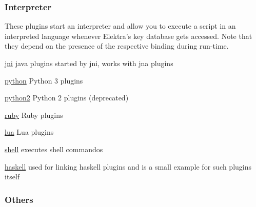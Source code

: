 \subsubsection*{Interpreter}

These plugins start an interpreter and allow you to execute a script in an interpreted language whenever Elektra’s key database gets accessed. Note that they depend on the presence of the respective binding during run-\/time.


\begin{DoxyItemize}
\item \hyperlink{md_src_plugins_jni_README_src_plugins_jni_README_md}{jni} java plugins started by jni, works with jna plugins
\item \hyperlink{md_src_plugins_python_README_src_plugins_python_README_md}{python} Python 3 plugins
\item \hyperlink{md_src_plugins_python2_README_src_plugins_python2_README_md}{python2} Python 2 plugins (deprecated)
\item \hyperlink{md_src_plugins_ruby_README_src_plugins_ruby_README_md}{ruby} Ruby plugins
\item \hyperlink{md_src_plugins_lua_README_src_plugins_lua_README_md}{lua} Lua plugins
\item \hyperlink{md_src_plugins_shell_README_src_plugins_shell_README_md}{shell} executes shell commandos
\item \hyperlink{md_src_plugins_haskell_README_src_plugins_haskell_README_md}{haskell} used for linking haskell plugins and is a small example for such plugins itself
\end{DoxyItemize}

\subsubsection*{Others}


